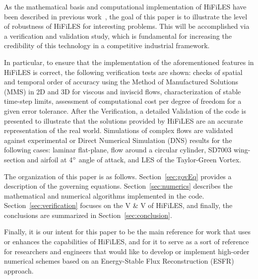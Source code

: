 As the mathematical basis and computational implementation of HiFiLES have been described in previous work~\cite{castonguay2011}, the goal of this paper is to illustrate the level of robustness of HiFiLES for interesting problems. This will be accomplished via a verification and validation study, which is fundamental for increasing the credibility of this technology in a competitive industrial framework.

In particular, to ensure that the implementation of the aforementioned features in HiFiLES is correct, the following verification tests are shown: checks of spatial and temporal order of accuracy using the Method of Manufactured Solutions (MMS) in 2D and 3D for viscous and inviscid flows, characterization of stable time-step limits, assessment of computational cost per degree of freedom for a given error tolerance. After the Verification, a detailed Validation of the code is presented to illustrate that the solutions provided by HiFiLES are an accurate representation of the real world. Simulations of complex flows are validated against experimental or Direct Numerical Simulation (DNS) results for the following cases: laminar flat-plane, flow around a circular cylinder, SD7003 wing-section and airfoil at 4$^{\circ}$ angle of attack, and LES of the Taylor-Green Vortex.

The organization of this paper is as follows. Section~\ref{sec:govEq} provides a description of the governing equations. Section~\ref{sec:numerics} describes the mathematical and numerical algorithms implemented in the code. Section~\ref{sec:verification} focuses on the V \& V of HiFiLES, and finally, the conclusions are summarized in Section~\ref{sec:conclusion}.

Finally, it is our intent for this paper to be the main reference for work that uses or enhances the capabilities of HiFiLES, and for it to serve as a sort of reference for researchers and engineers that would like to develop or implement high-order numerical schemes based on an Energy-Stable Flux Reconstruction (ESFR) approach.